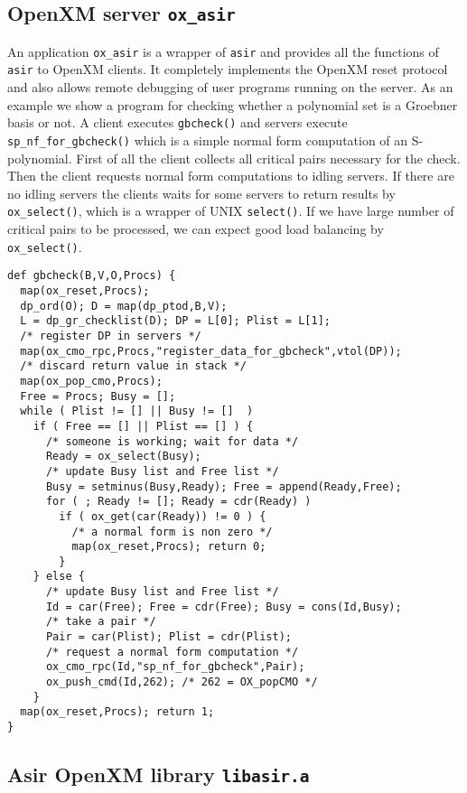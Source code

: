 \documentclass[runningheads]{cl2emult}
\begin{document}
\subsection{OpenXM server {\tt ox\_asir}}

An application {\tt ox\_asir} is a wrapper of {\tt asir} and provides
all the functions of {\tt asir} to OpenXM clients. It completely
implements the OpenXM reset protocol and also allows remote
debugging of user programs running on the server. As an example we
show a program for checking whether a polynomial set is a Groebner
basis or not. A client executes {\tt gbcheck()} and servers execute
{\tt sp\_nf\_for\_gbcheck()} which is a simple normal form computation
of an S-polynomial. First of all the client collects all critical pairs
necessary for the check. Then the client requests normal form
computations to idling servers. If there are no idling servers the
clients waits for some servers to return results by {\tt
ox\_select()}, which is a wrapper of UNIX {\tt select()}. If we have
large number of critical pairs to be processed, we can expect good
load balancing by {\tt ox\_select()}.

\begin{verbatim}
def gbcheck(B,V,O,Procs) {
  map(ox_reset,Procs);
  dp_ord(O); D = map(dp_ptod,B,V);  
  L = dp_gr_checklist(D); DP = L[0]; Plist = L[1];
  /* register DP in servers */
  map(ox_cmo_rpc,Procs,"register_data_for_gbcheck",vtol(DP));
  /* discard return value in stack */
  map(ox_pop_cmo,Procs);
  Free = Procs; Busy = [];
  while ( Plist != [] || Busy != []  )
    if ( Free == [] || Plist == [] ) {
      /* someone is working; wait for data */
      Ready = ox_select(Busy);
	  /* update Busy list and Free list */
      Busy = setminus(Busy,Ready); Free = append(Ready,Free);
      for ( ; Ready != []; Ready = cdr(Ready) )
        if ( ox_get(car(Ready)) != 0 ) {
		  /* a normal form is non zero */
          map(ox_reset,Procs); return 0;
        }
    } else {
	  /* update Busy list and Free list */
      Id = car(Free); Free = cdr(Free); Busy = cons(Id,Busy);
	  /* take a pair */
	  Pair = car(Plist); Plist = cdr(Plist);
	  /* request a normal form computation */
      ox_cmo_rpc(Id,"sp_nf_for_gbcheck",Pair);
      ox_push_cmd(Id,262); /* 262 = OX_popCMO */
    }
  map(ox_reset,Procs); return 1;
}
\end{verbatim}

\subsection{Asir OpenXM library {\tt libasir.a}}
\end{document}

